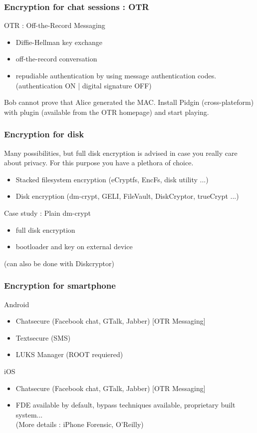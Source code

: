 \begin{frame}
\frametitle{Encryption for chat sessions : OTR}
\begin{block}{OTR : Off-the-Record Messaging}
\begin{itemize}
\item Diffie-Hellman key exchange
\item off-the-record conversation
\item repudiable authentication by using message authentication codes.
\\(authentication ON | digital signature OFF)
\end{itemize}
\end{block}
Bob cannot prove that Alice generated the MAC.
Install Pidgin (cross-plateform) with plugin (available from the OTR homepage)
and start playing.
\end{frame}
\begin{frame}
\frametitle{Encryption for disk}
Many possibilities, but full disk encryption is advised in case you really care
about privacy. For this purpose you have a plethora of choice.
\begin{itemize}
\item Stacked filesystem encryption (eCryptfs, EncFs, disk utility ...)
\item Disk encryption (dm-crypt, GELI, FileVault, DiskCryptor, trueCrypt ...)
\end{itemize}
\begin{block}{Case study : Plain dm-crypt}
\begin{itemize}
\item full disk encryption
\item bootloader and key on external device
\end{itemize}
\end{block}
(can also be done with Diskcryptor)
\end{frame}
\begin{frame}
\frametitle{Encryption for smartphone}
\begin{block}{Android}
\begin{itemize}
\item Chatsecure (Facebook chat, GTalk, Jabber) [OTR Messaging]
\item Textsecure (SMS)
\item LUKS Manager (ROOT requiered)
\end{itemize}
\end{block}
\begin{block}{iOS}
\begin{itemize}
\item Chatsecure (Facebook chat, GTalk, Jabber) [OTR Messaging]
\item FDE available by default, bypass techniques available, proprietary
built system...\\ (More details : iPhone Forensic, O'Reilly)
\end{itemize}
\end{block}
\end{frame}

